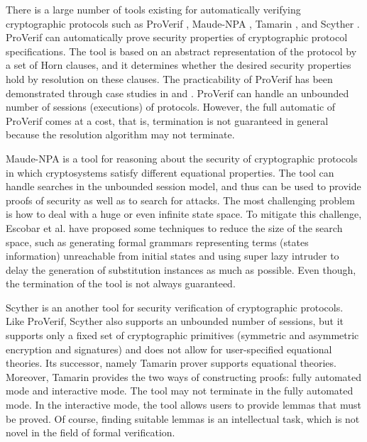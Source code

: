\documentclass[a4paper,fleqn]{cas-dc}
\begin{document}

There is a large number of tools existing for automatically verifying cryptographic protocols such as ProVerif \cite{proverif}, Maude-NPA \cite{maudenpa}, Tamarin \cite{tamarin}, and Scyther \cite{Scyther08}.
ProVerif can automatically prove security properties of cryptographic protocol specifications.
The tool is based on an abstract representation of the protocol by a set of Horn clauses,
and it determines whether the desired security properties hold by resolution on these clauses.
The practicability of ProVerif has been demonstrated through case studies in \cite{proverif2} and \cite{proverif3}. 
ProVerif can handle an unbounded number of sessions (executions) of protocols. 
However, the full automatic of ProVerif comes at a cost, that is, termination is not guaranteed in general because the resolution algorithm may not terminate. 

Maude-NPA \cite{maudenpa} is a tool for reasoning about the security of cryptographic protocols in which cryptosystems satisfy different equational properties.
The tool can handle searches in the unbounded session model, and thus can be used to provide proofs of security as well as to search for attacks.
The most challenging problem is how to deal with a huge or even infinite state space.
To mitigate this challenge, Escobar et al. \cite{maudenpa08} have proposed some techniques to reduce the size of the search space, such as generating formal grammars representing terms (states information) unreachable from initial states and using super lazy intruder to delay the generation of substitution instances as much as possible.
Even though, the termination of the tool is not always guaranteed.

Scyther \cite{Scyther08} is an another tool for security verification of cryptographic protocols.
Like ProVerif, Scyther also supports an unbounded number of sessions, but it supports only a fixed set of cryptographic primitives (symmetric and asymmetric encryption and signatures) and does not allow for user-specified equational theories.
Its successor, namely Tamarin prover \cite{tamarin} supports equational theories.
Moreover, Tamarin  provides the two ways of constructing proofs: fully automated mode and interactive mode. 
The tool may not terminate in the fully automated mode.
In the interactive mode, the tool allows users to provide lemmas that must be proved. 
Of course, finding suitable lemmas is an intellectual task, which is not novel in the field of formal verification.
\end{document}
